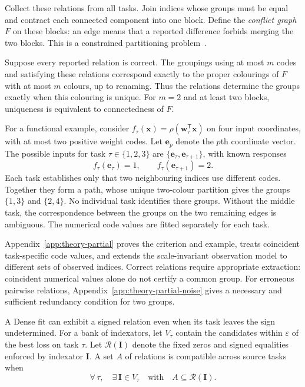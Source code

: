 Collect these relations from all tasks. Join indices whose groups
must be equal and contract each connected component into one block.
Define the \emph{conflict graph} $F$ on these blocks: an edge means
that a reported difference forbids merging the two blocks.
This is a constrained partitioning problem~\cite{davidson2007complexity}.

\begin{proposition}
    \label{prop:theory-partial-completion}
    Suppose every reported relation is correct.
    The groupings using at most $m$ codes and satisfying these
    relations correspond exactly to the proper colourings of $F$
    with at most $m$ colours, up to renaming.
    Thus the relations determine the groups exactly when this
    colouring is unique. For $m=2$ and at least two blocks,
    uniqueness is equivalent to connectedness of $F$.
\end{proposition}

For a functional example, consider
$f_\tau(\mathbf x)=\rho
    (\mathbf w_\tau^{\mathsf T}\mathbf x)$
on four input coordinates, with at most two positive weight codes.
Let $\mathbf e_p$ denote the $p$th coordinate vector.
The possible inputs for task $\tau\in\{1,2,3\}$ are
$\{\mathbf e_\tau,\mathbf e_{\tau+1}\}$, with known responses
$$
    f_\tau(\mathbf e_\tau)=1,\qquad
    f_\tau(\mathbf e_{\tau+1})=2.
$$
Each task establishes only that two neighbouring indices use
different codes. Together they form a path, whose unique
two-colour partition gives the groups $\{1,3\}$ and $\{2,4\}$.
No individual task identifies these groups. Without the middle
task, the correspondence between the groups on the two remaining
edges is ambiguous. The numerical code values are fitted separately
for each task.

Appendix~\ref{app:theory-partial} proves the criterion and example,
treats coincident task-specific code values, and extends the
scale-invariant observation model to different sets of observed
indices. Correct relations require appropriate extraction:
coincident numerical values alone do not certify a common group.
For erroneous pairwise relations, Appendix~\ref{app:theory-partial-noise}
gives a necessary and sufficient redundancy condition for two groups.

A Dense fit can exhibit a signed relation even when its task leaves
the sign undetermined. For a bank of indexators, let $V_\tau$ contain
the candidates within $\varepsilon$ of the best loss on task $\tau$.
Let $\mathcal R(\mathbf I)$ denote the fixed zeros and signed
equalities enforced by indexator $\mathbf I$. A set $A$ of relations
is compatible across source tasks when
\begin{equation}
    \forall\,\tau,\quad
    \exists\,\mathbf I\in V_\tau\quad\text{with}\quad
    A\subseteq\mathcal R(\mathbf I).
    \label{eq:method-joint-relations}
\end{equation}

